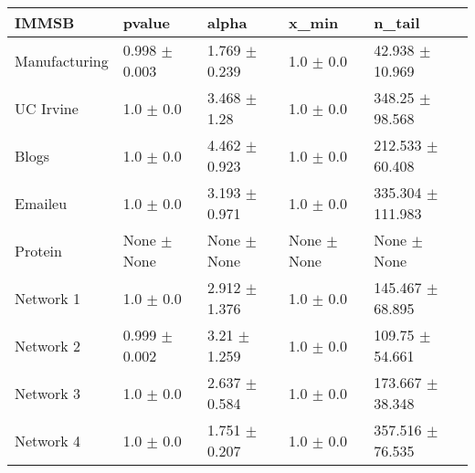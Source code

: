 \begin{tabular}{@{}lllll@{}}
\toprule

\textbf{IMMSB} & pvalue & alpha & x\_min & n\_tail \\\midrule

Manufacturing & 0.998 \(\pm\) 0.003 & 1.769 \(\pm\) 0.239 & 1.0 \(\pm\)
0.0 & 42.938 \(\pm\) 10.969 \\
UC Irvine & 1.0 \(\pm\) 0.0 & 3.468 \(\pm\) 1.28 & 1.0 \(\pm\)
0.0 & 348.25 \(\pm\) 98.568 \\
Blogs & 1.0 \(\pm\) 0.0 & 4.462 \(\pm\) 0.923 & 1.0 \(\pm\)
0.0 & 212.533 \(\pm\) 60.408 \\
Emaileu & 1.0 \(\pm\) 0.0 & 3.193 \(\pm\) 0.971 & 1.0 \(\pm\)
0.0 & 335.304 \(\pm\) 111.983 \\
Protein & None \(\pm\) None & None \(\pm\) None & None \(\pm\)
None & None \(\pm\) None \\
Network 1 & 1.0 \(\pm\) 0.0 & 2.912 \(\pm\) 1.376 & 1.0 \(\pm\)
0.0 & 145.467 \(\pm\) 68.895 \\
Network 2 & 0.999 \(\pm\) 0.002 & 3.21 \(\pm\) 1.259 & 1.0 \(\pm\)
0.0 & 109.75 \(\pm\) 54.661 \\
Network 3 & 1.0 \(\pm\) 0.0 & 2.637 \(\pm\) 0.584 & 1.0 \(\pm\)
0.0 & 173.667 \(\pm\) 38.348 \\
Network 4 & 1.0 \(\pm\) 0.0 & 1.751 \(\pm\) 0.207 & 1.0 \(\pm\)
0.0 & 357.516 \(\pm\) 76.535 \\

\bottomrule
\end{tabular}

